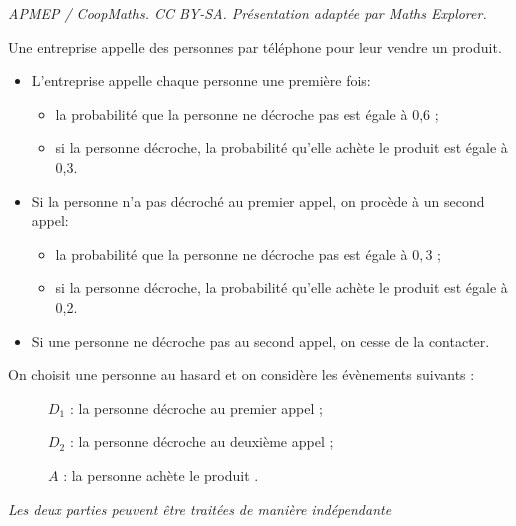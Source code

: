\documentclass[10pt]{article}
\begin{document}
\noindent\textit{APMEP / CoopMaths. CC BY-SA. Présentation adaptée par Maths Explorer.}\par\medskip
\medskip

Une entreprise appelle des personnes par téléphone pour leur vendre un produit. 

\begin{itemize}
\item L'entreprise appelle chaque personne une première fois:
\begin{itemize}
\item[$\bullet~~$]la probabilité que la personne ne décroche pas est égale à 0,6 ;
\item[$\bullet~~$]si la personne décroche, la probabilité qu'elle achète le produit est égale à 0,3.
\end{itemize}
\item Si la personne n'a pas décroché au premier appel, on procède à un second appel: 
\begin{itemize}
\item[$\bullet~~$]la probabilité que la personne ne décroche pas est égale à $0,3$ ;
\item[$\bullet~~$]si la personne décroche, la probabilité qu'elle achète le produit est égale à 0,2.
\end{itemize}
\item Si une personne ne décroche pas au second appel, on cesse de la contacter.
\end{itemize}

\medskip

On choisit une personne au hasard et on considère les évènements suivants : 

\begin{description}
\item[ ] $D_1$ : \og la personne décroche au premier appel\fg{} ;
\item[ ] $D_2$ : \og la personne décroche au deuxième appel\fg{} ;
\item[ ] $A$ : \og la personne achète le produit \fg.
\end{description}

\begin{center}\emph{Les deux parties peuvent être traitées de manière indépendante}\end{center}
\end{document}
